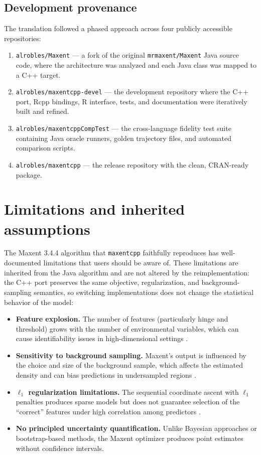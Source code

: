 \documentclass[10pt,letterpaper]{article}
\providecommand{\tightlist}{%
  \setlength{\itemsep}{0pt}\setlength{\parskip}{0pt}}
\begin{document}
\subsection*{Development provenance}

The translation followed a phased approach across four publicly
accessible repositories:

\begin{enumerate}
\def\labelenumi{\arabic{enumi}.}
\tightlist
\item
  \texttt{alrobles/Maxent} --- a fork of the original
  \texttt{mrmaxent/Maxent} \cite{Phillips2017} Java source code, where
  the architecture was analyzed and each Java class was mapped to a C++
  target.
\item
  \texttt{alrobles/maxentcpp-devel} --- the development repository where
  the C++ port, Rcpp bindings, R interface, tests, and documentation
  were iteratively built and refined.
\item
  \texttt{alrobles/maxentcppCompTest} --- the cross-language fidelity
  test suite containing Java oracle runners, golden trajectory files,
  and automated comparison scripts.
\item
  \texttt{alrobles/maxentcpp} --- the release repository with the clean,
  CRAN-ready package.
\end{enumerate}

\section*{Limitations and inherited
assumptions}

The Maxent 3.4.4 algorithm that \texttt{maxentcpp} faithfully reproduces
has well-documented limitations that users should be aware of. These
limitations are inherited from the Java algorithm and are not altered by
the reimplementation: the C++ port preserves the same objective,
regularization, and background-sampling semantics, so switching
implementations does not change the statistical behavior of the model:

\begin{itemize}
\tightlist
\item
  \textbf{Feature explosion.} The number of features (particularly hinge
  and threshold) grows with the number of environmental variables, which
  can cause identifiability issues in high-dimensional settings
  \cite{Elith2011,Merow2013}.
\item
  \textbf{Sensitivity to background sampling.} Maxent's output is
  influenced by the choice and size of the background sample, which
  affects the estimated density and can bias predictions in undersampled
  regions \cite{Phillips2008}.
\item
  \textbf{\(\ell_1\) regularization limitations.} The sequential
  coordinate ascent with \(\ell_1\) penalties produces sparse models but
  does not guarantee selection of the ``correct'' features under high
  correlation among predictors \cite{Hastie2015}.
\item
  \textbf{No principled uncertainty quantification.} Unlike Bayesian
  approaches or bootstrap-based methods, the Maxent optimizer produces
  point estimates without confidence intervals.
\end{itemize}
\end{document}
